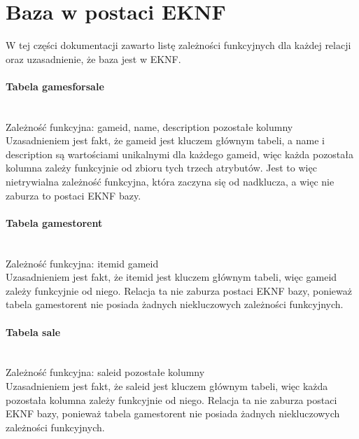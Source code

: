 \documentclass{article}
\begin{document}
	\section{Baza w postaci EKNF}
	W tej części dokumentacji zawarto listę zależności funkcyjnych dla każdej relacji oraz uzasadnienie, że baza jest w EKNF.
	
	\paragraph{Tabela games\textunderscore for\textunderscore sale}\mbox{}\vspace{0.2cm} \\
	Zależność funkcyjna: \textbraceleft game\textunderscore id, name, description\textbraceright \mbox{} \textrightarrow \mbox{} pozostałe kolumny \vspace{0.2cm} \\
	\noindent Uzasadnieniem jest fakt, że game\textunderscore id jest kluczem głównym tabeli, a name i description są wartościami unikalnymi dla każdego game\textunderscore id, więc każda pozostała kolumna zależy funkcyjnie od zbioru tych trzech atrybutów. Jest to więc nietrywialna zależność funkcyjna, która zaczyna się od nadklucza, a więc nie zaburza to postaci EKNF bazy.

	\paragraph{Tabela games\textunderscore to\textunderscore rent}\mbox{}\vspace{0.2cm} \\
	Zależność funkcyjna: item\textunderscore id\mbox{} \textrightarrow \mbox{} game\textunderscore id \vspace{0.2cm} \\
	\noindent Uzasadnieniem jest fakt, że item\textunderscore id jest kluczem głównym tabeli, więc game\textunderscore id zależy funkcyjnie od niego. Relacja ta nie zaburza postaci EKNF bazy, ponieważ tabela games\textunderscore to\textunderscore rent nie posiada żadnych niekluczowych zależności funkcyjnych.
	
	\paragraph{Tabela sale}\mbox{}\vspace{0.2cm} \\
	Zależność funkcyjna: sale\textunderscore id\mbox{} \textrightarrow \mbox{} pozostałe kolumny \vspace{0.2cm} \\
	\noindent Uzasadnieniem jest fakt, że sale\textunderscore id jest kluczem głównym tabeli, więc każda pozostała kolumna zależy funkcyjnie od niego. Relacja ta nie zaburza postaci EKNF bazy, ponieważ tabela games\textunderscore to\textunderscore rent nie posiada żadnych niekluczowych zależności funkcyjnych.
	
\end{document}
